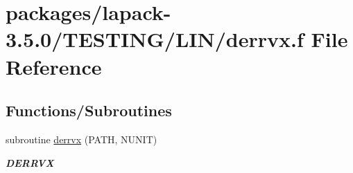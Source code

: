 \hypertarget{derrvx_8f}{}\section{packages/lapack-\/3.5.0/\+T\+E\+S\+T\+I\+N\+G/\+L\+I\+N/derrvx.f File Reference}
\label{derrvx_8f}
\subsection*{Functions/\+Subroutines}
\begin{DoxyCompactItemize}
\item 
subroutine \hyperlink{group__double__lin_gad53b9568f84ca78c561b3b9d220daf59}{derrvx} (P\+A\+T\+H, N\+U\+N\+I\+T)
\begin{DoxyCompactList}\small\item\em {\bfseries D\+E\+R\+R\+V\+X} \end{DoxyCompactList}\end{DoxyCompactItemize}
